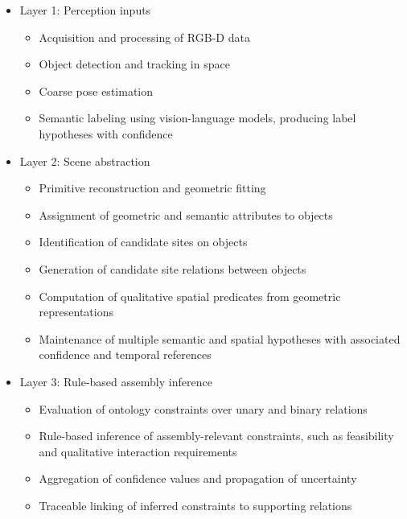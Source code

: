 \documentclass[11pt,titlepage,openright]{book}
\begin{document}
\begin{itemize}

  \item Layer 1: Perception inputs
    \begin{itemize}
      \item Acquisition and processing of RGB-D data
      \item Object detection and tracking in space
      \item Coarse pose estimation
      \item Semantic labeling using vision-language models, producing label hypotheses with confidence
    \end{itemize}

  \item Layer 2: Scene abstraction
    \begin{itemize}
      \item Primitive reconstruction and geometric fitting
      \item Assignment of geometric and semantic attributes to objects
      \item Identification of candidate sites on objects
      \item Generation of candidate site relations between objects
      \item Computation of qualitative spatial predicates from geometric representations \citet{Haesler_2025}
      \item Maintenance of multiple semantic and spatial hypotheses with associated confidence and temporal references
    \end{itemize}

  \item Layer 3: Rule-based assembly inference
    \begin{itemize}
      \item Evaluation of ontology constraints over unary and binary relations
      \item Rule-based inference of assembly-relevant constraints, such as feasibility and qualitative interaction requirements
      \item Aggregation of confidence values and propagation of uncertainty
      \item Traceable linking of inferred constraints to supporting relations
    \end{itemize}


\end{itemize}
\end{document}
